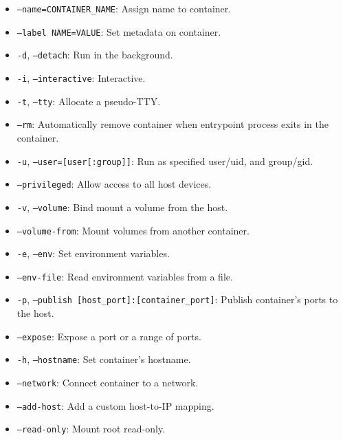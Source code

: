 \documentclass[a4paper,landscape]{article}
\begin{document}
\begin{multicols}{3}
\begin{itemize}
    \item \texttt{--name=CONTAINER\_NAME}: Assign name to container.
    \item \texttt{--label NAME=VALUE}: Set metadata on container.
    \item \texttt{-d}, \texttt{--detach}: Run in the background.
    \item \texttt{-i}, \texttt{--interactive}: Interactive.
    \item \texttt{-t}, \texttt{--tty}: Allocate a pseudo-TTY.
    \item \texttt{--rm}: Automatically remove container when entrypoint process exits in the container.
    \item \texttt{-u}, \texttt{--user=[user[:group]]}: Run as specified user/uid, and group/gid.
    \item \texttt{--privileged}: Allow access to all host devices.
    \item \texttt{-v}, \texttt{--volume}: Bind mount a volume from the host.
    \item \texttt{--volume-from}: Mount volumes from another container.
    \item \texttt{-e}, \texttt{--env}: Set environment variables.
    \item \texttt{--env-file}: Read environment variables from a file.
    \item \texttt{-p}, \texttt{--publish [host\_port]:[container\_port]}: Publish container's ports to the host.
    \item \texttt{--expose}: Expose a port or a range of ports.
    \item \texttt{-h}, \texttt{--hostname}: Set container's hostname.
    \item \texttt{--network}: Connect container to a network.
    \item \texttt{--add-host}: Add a custom host-to-IP mapping.
    \item \texttt{--read-only}: Mount root read-only.
\end{itemize}


\end{multicols}
\end{document}
